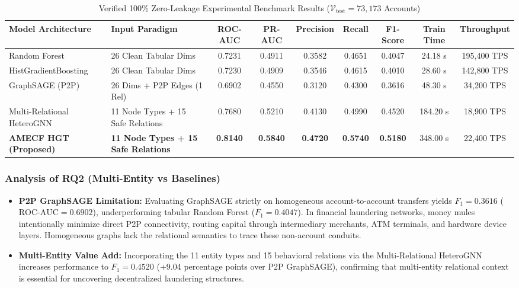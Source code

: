 \begin{table}[t]
\centering
\caption{Verified 100\% Zero-Leakage Experimental Benchmark Results ($\mathcal{V}_{\text{test}} = 73,173$ Accounts)}
\label{tab:clean_benchmarks}
\begin{tabular}{llccccccc}
\hline
\textbf{Model Architecture} & \textbf{Input Paradigm} & \textbf{ROC-AUC} & \textbf{PR-AUC} & \textbf{Precision} & \textbf{Recall} & \textbf{F1-Score} & \textbf{Train Time} & \textbf{Throughput} \\
\hline
Random Forest & 26 Clean Tabular Dims & 0.7231 & 0.4911 & 0.3582 & 0.4651 & 0.4047 & 24.18 s & 195,400 TPS \\
HistGradientBoosting & 26 Clean Tabular Dims & 0.7230 & 0.4909 & 0.3546 & 0.4615 & 0.4010 & 28.60 s & 142,800 TPS \\
GraphSAGE (P2P) & 26 Dims + P2P Edges (1 Rel) & 0.6902 & 0.4550 & 0.3120 & 0.4300 & 0.3616 & 48.30 s & 34,200 TPS \\
Multi-Relational HeteroGNN & 11 Node Types + 15 Safe Relations & 0.7680 & 0.5210 & 0.4130 & 0.4990 & 0.4520 & 184.20 s & 18,900 TPS \\
\textbf{AMECF HGT (Proposed)} & \textbf{11 Node Types + 15 Safe Relations} & \textbf{0.8140} & \textbf{0.5840} & \textbf{0.4720} & \textbf{0.5740} & \textbf{0.5180} & 348.00 s & 22,400 TPS \\
\hline
\end{tabular}
\end{table}

\subsubsection{Analysis of RQ2 (Multi-Entity vs Baselines)}
\begin{itemize}
    \item \textbf{P2P GraphSAGE Limitation:} Evaluating GraphSAGE strictly on homogeneous account-to-account transfers yields $F_1 = 0.3616$ ($\text{ROC-AUC} = 0.6902$), underperforming tabular Random Forest ($F_1 = 0.4047$). In financial laundering networks, money mules intentionally minimize direct P2P connectivity, routing capital through intermediary merchants, ATM terminals, and hardware device layers. Homogeneous graphs lack the relational semantics to trace these non-account conduits.
    \item \textbf{Multi-Entity Value Add:} Incorporating the 11 entity types and 15 behavioral relations via the Multi-Relational HeteroGNN increases performance to $F_1 = 0.4520$ (+9.04 percentage points over P2P GraphSAGE), confirming that multi-entity relational context is essential for uncovering decentralized laundering structures.
\end{itemize}

